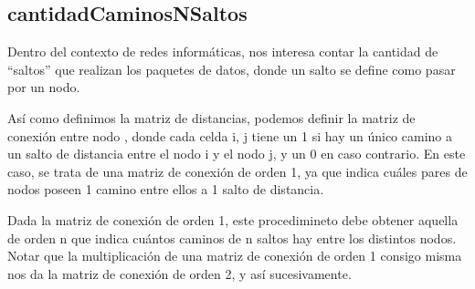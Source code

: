 \documentclass[10pt,a4paper]{article}
\begin{document}
\vspace{4mm}


\subsection{cantidadCaminosNSaltos}

 Dentro del contexto de redes informáticas, nos interesa contar la cantidad de “saltos” que realizan los paquetes de datos, donde un salto se define como pasar por un nodo.

Así como definimos la matriz de distancias, podemos definir la matriz de conexión entre nodo , donde cada celda i, j tiene un 1 si hay un único camino a un salto de distancia entre el nodo i y el nodo j, y un 0 en caso contrario. En este caso, se trata de una matriz de conexión de orden 1, ya que indica cuáles pares de nodos poseen 1 camino entre ellos a 1 salto de distancia.

Dada la matriz de conexión de orden 1, este procedimineto debe obtener aquella de orden n que indica cuántos caminos de n saltos hay entre los distintos nodos. Notar que la multiplicación de una matriz de conexión de orden 1 consigo misma nos da la matriz de conexión de orden 2, y así sucesivamente.

\vspace{2mm}
 

 
 

 
\end{document}
